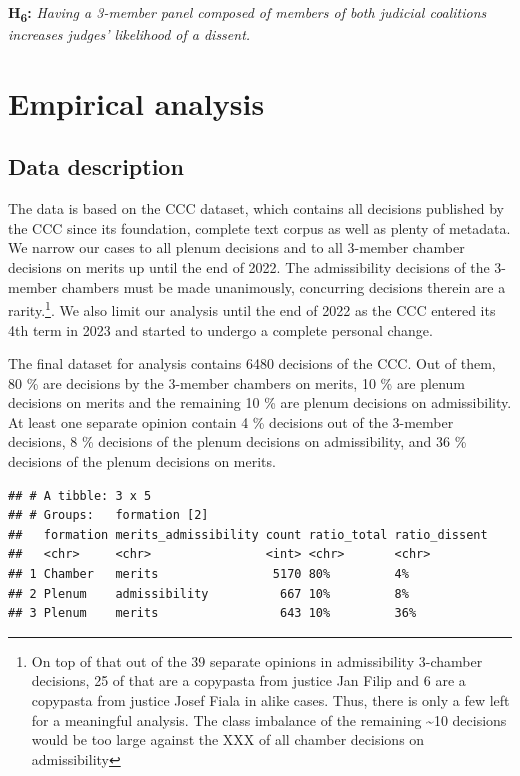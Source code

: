 \documentclass[
  11pt,
]{article}
\begin{document}
\textbf{H\textsubscript{6}:} \emph{Having a 3-member panel composed of
members of both judicial coalitions increases judges' likelihood of a
dissent.}

\hypertarget{empirical-analysis}{%
\section{Empirical analysis}\label{empirical-analysis}}

\hypertarget{data-description}{%
\subsection{Data description}\label{data-description}}

The data is based on the CCC dataset, which contains all decisions
published by the CCC since its foundation, complete text corpus as well
as plenty of metadata. We narrow our cases to all plenum decisions and
to all 3-member chamber decisions on merits up until the end of 2022.
The admissibility decisions of the 3-member chambers must be made
unanimously, concurring decisions therein are a rarity.\footnote{On top
  of that out of the 39 separate opinions in admissibility 3-chamber
  decisions, 25 of that are a copypasta from justice Jan Filip and 6 are
  a copypasta from justice Josef Fiala in alike cases. Thus, there is
  only a few left for a meaningful analysis. The class imbalance of the
  remaining \textasciitilde10 decisions would be too large against the
  XXX of all chamber decisions on admissibility}. We also limit our
analysis until the end of 2022 as the CCC entered its 4th term in 2023
and started to undergo a complete personal change.

The final dataset for analysis contains 6480 decisions of the CCC. Out
of them, 80 \% are decisions by the 3-member chambers on merits, 10 \%
are plenum decisions on merits and the remaining 10 \% are plenum
decisions on admissibility. At least one separate opinion contain 4 \%
decisions out of the 3-member decisions, 8 \% decisions of the plenum
decisions on admissibility, and 36 \% decisions of the plenum decisions
on merits.

\begin{verbatim}
## # A tibble: 3 x 5
## # Groups:   formation [2]
##   formation merits_admissibility count ratio_total ratio_dissent
##   <chr>     <chr>                <int> <chr>       <chr>        
## 1 Chamber   merits                5170 80%         4%           
## 2 Plenum    admissibility          667 10%         8%           
## 3 Plenum    merits                 643 10%         36%
\end{verbatim}
\end{document}
